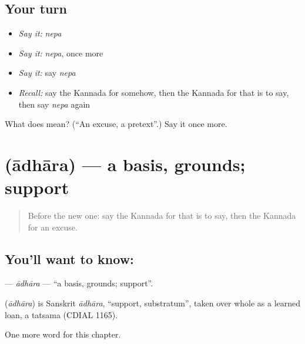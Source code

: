 \subsection*{Your turn}
\begin{itemize}
\raggedright
  \item \emph{Say it:} \emph{nepa}
  \item \emph{Say it:} \emph{nepa}, once more
  \item \emph{Say it:} say \emph{nepa}
  \item \emph{Recall:} say the Kannada for somehow, then the Kannada for that is to say, then say \emph{nepa} again
\end{itemize}

\begin{tcolorbox}[breakable,colback=teal!4,colframe=teal!35!black,title={Before you move on}]
What does  mean? (\textquotedblleft{}An excuse, a pretext\textquotedblright{}.) Say it once more.
\end{tcolorbox}
\section[\texorpdfstring{\kn{ಆಧಾರ} (ādhāra)}{ಆಧಾರ (ādhāra)}]{ (ādhāra) — a basis, grounds; support}

\label{lesson:KA-C289-adhara}



\begin{quote}
Before the new one: say the Kannada for that is to say, then the Kannada for an excuse.
\end{quote}

\subsection*{You'll want to know: }
\textbf{} — \emph{ādhāra} — \textquotedblleft{}a basis, grounds; support\textquotedblright{}.

\begin{cousinweb}
\textbf{} (\emph{ādhāra}) is Sanskrit \emph{ādhāra}, \textquotedblleft{}support, substratum\textquotedblright{}, taken over whole as a learned loan, a tatsama (CDIAL 1165).
\end{cousinweb}

\begin{grammarlens}[title={What you've built}]
One more word for this chapter.
\end{grammarlens}

